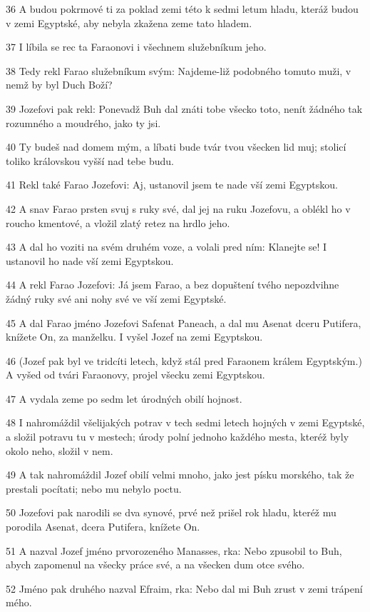 \par 36 A budou pokrmové ti za poklad zemi této k sedmi letum hladu, kteráž budou v zemi Egyptské, aby nebyla zkažena zeme tato hladem.
\par 37 I líbila se rec ta Faraonovi i všechnem služebníkum jeho.
\par 38 Tedy rekl Farao služebníkum svým: Najdeme-liž podobného tomuto muži, v nemž by byl Duch Boží?
\par 39 Jozefovi pak rekl: Ponevadž Buh dal znáti tobe všecko toto, nenít žádného tak rozumného a moudrého, jako ty jsi.
\par 40 Ty budeš nad domem mým, a líbati bude tvár tvou všecken lid muj; stolicí toliko královskou vyšší nad tebe budu.
\par 41 Rekl také Farao Jozefovi: Aj, ustanovil jsem te nade vší zemi Egyptskou.
\par 42 A snav Farao prsten svuj s ruky své, dal jej na ruku Jozefovu, a oblékl ho v roucho kmentové, a vložil zlatý retez na hrdlo jeho.
\par 43 A dal ho voziti na svém druhém voze, a volali pred ním: Klanejte se! I ustanovil ho nade vší zemi Egyptskou.
\par 44 A rekl Farao Jozefovi: Já jsem Farao, a bez dopuštení tvého nepozdvihne žádný ruky své ani nohy své ve vší zemi Egyptské.
\par 45 A dal Farao jméno Jozefovi Safenat Paneach, a dal mu Asenat dceru Putifera, knížete On, za manželku. I vyšel Jozef na zemi Egyptskou.
\par 46 (Jozef pak byl ve tridcíti letech, když stál pred Faraonem králem Egyptským.) A vyšed od tvári Faraonovy, projel všecku zemi Egyptskou.
\par 47 A vydala zeme po sedm let úrodných obilí hojnost.
\par 48 I nahromáždil všelijakých potrav v tech sedmi letech hojných v zemi Egyptské, a složil potravu tu v mestech; úrody polní jednoho každého mesta, kteréž byly okolo neho, složil v nem.
\par 49 A tak nahromáždil Jozef obilí velmi mnoho, jako jest písku morského, tak že prestali pocítati; nebo mu nebylo poctu.
\par 50 Jozefovi pak narodili se dva synové, prvé než prišel rok hladu, kteréž mu porodila Asenat, dcera Putifera, knížete On.
\par 51 A nazval Jozef jméno prvorozeného Manasses, rka: Nebo zpusobil to Buh, abych zapomenul na všecky práce své, a na všecken dum otce svého.
\par 52 Jméno pak druhého nazval Efraim, rka: Nebo dal mi Buh zrust v zemi trápení mého.
